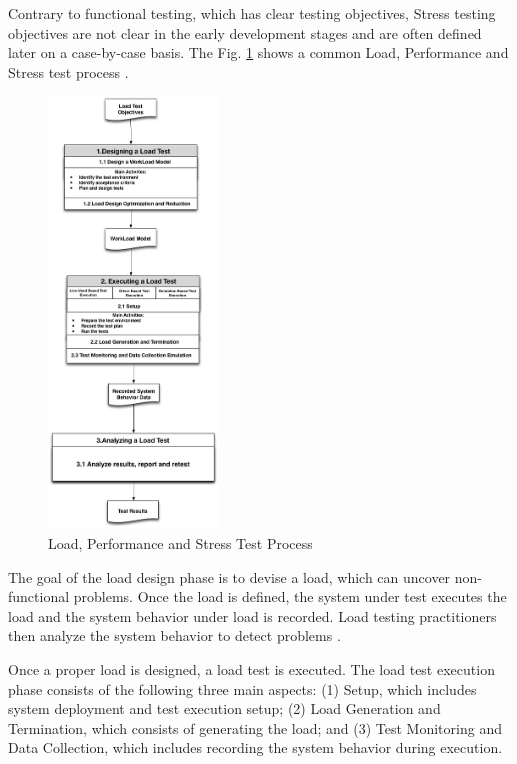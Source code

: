 \documentclass{report}
\begin{document}
Contrary to functional testing, which has clear testing objectives, Stress testing objectives are not clear in the early development stages and are often defined later on a case-by-case basis. The Fig. \ref{fig:testprocess} shows a common Load, Performance and Stress test process  \cite{Jiang2010}.

\begin{figure}[!ht]
\centering
\includegraphics[width=0.4\textwidth]{./images/testprocess.png}
\caption{Load, Performance and Stress Test Process \cite{Jiang2010}\cite{Erinle2013}}
\label{fig:testprocess}
\end{figure}


The goal of the load design phase is to devise a load, which can uncover non-functional problems. Once the load is defined, the system under test executes the load and the system behavior under load is recorded. Load testing practitioners then analyze the system behavior to detect problems \cite{Jiang2010}. 

Once a proper load is designed, a load test is executed. The load test execution phase consists of the following three main aspects: (1) Setup, which includes system deployment and test execution setup; (2) Load Generation and Termination, which consists of generating the load; and (3) Test Monitoring and Data Collection, which includes recording the system behavior during execution\cite{Jiang2010}. 
\end{document}
